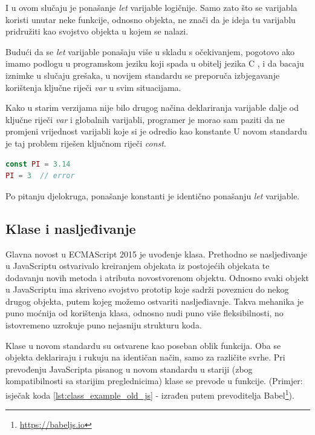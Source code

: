 \documentclass[times, utf8, zavrsni, numeric]{fer}
\newcommand{\razmakp}{\vspace{18pt}}
\newcommand{\razmaks}{\vspace{10pt}}
\begin{document}
I u ovom slučaju je ponašanje \emph{let} varijable logičnije. Samo zato što se varijabla koristi unutar neke funkcije, odnosno objekta, ne znači da je ideja tu varijablu pridružiti kao svojstvo objekta u kojem se nalazi.

\razmakp

Budući da se \emph{let} varijable ponašaju više u skladu s očekivanjem, pogotovo ako imamo podlogu u programskom jeziku koji spada u obitelj jezika C , i da bacaju iznimke u slučaju grešaka, u novijem standardu se preporuča izbjegavanje korištenja ključne riječi \emph{var} u svim situacijama.

\razmakp
\razmakp

Kako u starim verzijama nije bilo drugog načina deklariranja varijable dalje od ključne riječi \emph{var} i globalnih varijabli, programer je morao sam paziti da ne promjeni vrijednost varijabli koje si je odredio kao konstante
U novom standardu je taj problem riješen ključnom riječi \emph{const}\citep{MDNConst}.

\razmakp
\begin{lstlisting}[language=JavaScript, caption={Deklariranje konstante}]
const PI = 3.14
PI = 3  // error
\end{lstlisting}
\razmaks

Po pitanju djelokruga, ponašanje konstanti je identično ponašanju \emph{let} varijable.

\razmakp


\subsection{Klase i nasljeđivanje}

Glavna novost u ECMAScript 2015 je uvođenje klasa.
Prethodno se nasljeđivanje u JavaScriptu ostvarivalo kreiranjem objekata iz postojećih objekata te dodavanju novih metoda i atributa novostvorenom objektu.
Odnosno svaki objekt u JavaScriptu ima skriveno svojstvo prototip  koje sadrži poveznicu do nekog drugog objekta, putem kojeg možemo ostvariti nasljeđiavnje\citep{MDNPrototype}.
Takva mehanika je puno moćnija od korištenja klasa, odnosno nudi puno više fleksibilnosti, no istovremeno uzrokuje puno nejasniju strukturu koda.

Klase u novom standardu su ostvarene kao poseban oblik funkcija\citep{MDNClass}.
Oba se objekta deklariraju i rukuju na identičan način, samo za različite svrhe.
Pri prevođenju JavaScripta pisanog u novom standardu u stariji (zbog kompatibilnosti sa starijim preglednicima) klase se prevode u funkcije.
(Primjer: isječak koda \ref{lst:class_example_old_js} - izrađen putem prevoditelja Babel\footnote{\url{https://babeljs.io}}).
\end{document}
